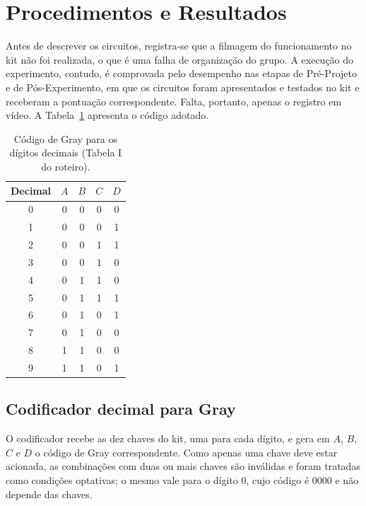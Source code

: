 \documentclass[12pt]{article}
\begin{document}
\section{Procedimentos e Resultados}
\label{sec:Procedimentos}

Antes de descrever os circuitos, registra-se que a filmagem do funcionamento no kit não foi realizada, o que é uma falha de organização do grupo. A execução do experimento, contudo, é comprovada pelo desempenho nas etapas de Pré-Projeto e de Pós-Experimento, em que os circuitos foram apresentados e testados no kit e receberam a pontuação correspondente. Falta, portanto, apenas o registro em vídeo. A Tabela~\ref{tab:gray} apresenta o código adotado.

\begin{table}[H]
    \centering
    \caption{Código de Gray para os dígitos decimais (Tabela I do roteiro).}
    \label{tab:gray}
    \begin{tabular}{|c|c|c|c|c|}
        \hline
        Decimal & $A$ & $B$ & $C$ & $D$ \\
        \hline
        0 & 0 & 0 & 0 & 0 \\
        \hline
        1 & 0 & 0 & 0 & 1 \\
        \hline
        2 & 0 & 0 & 1 & 1 \\
        \hline
        3 & 0 & 0 & 1 & 0 \\
        \hline
        4 & 0 & 1 & 1 & 0 \\
        \hline
        5 & 0 & 1 & 1 & 1 \\
        \hline
        6 & 0 & 1 & 0 & 1 \\
        \hline
        7 & 0 & 1 & 0 & 0 \\
        \hline
        8 & 1 & 1 & 0 & 0 \\
        \hline
        9 & 1 & 1 & 0 & 1 \\
        \hline
    \end{tabular}
\end{table}

\subsection{Codificador decimal para Gray}
\label{sec:Encoder}

O codificador recebe as dez chaves do kit, uma para cada dígito, e gera em $A$, $B$, $C$ e $D$ o código de Gray correspondente. Como apenas uma chave deve estar acionada, as combinações com duas ou mais chaves são inválidas e foram tratadas como condições optativas; o mesmo vale para o dígito 0, cujo código é $0000$ e não depende das chaves.
\end{document}

